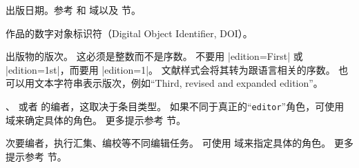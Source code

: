 \begin{fieldlist}

出版日期。参考  和  域以及  节。




作品的数字对象标识符（Digital Object Identifier,  DOI）。




出版物的版次。
这必须是整数而不是序数。
不要用 |edition={First}| 或 |edition={1st}|，而要用 |edition={1}|。
文献样式会将其转为跟语言相关的序数。
也可以用文本字符串表示版次，例如“Third, revised and expanded edition”。




、 或者  的编者，这取决于条目类型。
如果不同于真正的“\texttt{editor}”角色，可使用  域来确定具体的角色。
更多提示参考  节。




次要编者，执行汇集、编校等不同编辑任务。
可使用  域来指定具体的角色。
更多提示参考  节。




\end{fieldlist}
